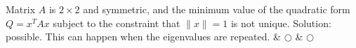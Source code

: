 \fi    
\ifnum {} %
    \setlength{\extrarowheight}{0.00cm} Matrix $A$ is $2\times 2$ and symmetric, and the minimum value of the quadratic form $Q = x^TAx$ subject to the constraint that $\|x\|=1$ is not unique. 
    \ifnum {} {\color{DarkBlue} Solution: possible. This can happen when the eigenvalues are repeated. 
    } \fi
\fi    
& $\bigcirc$ & $\bigcirc$ \\[4pt] \hline